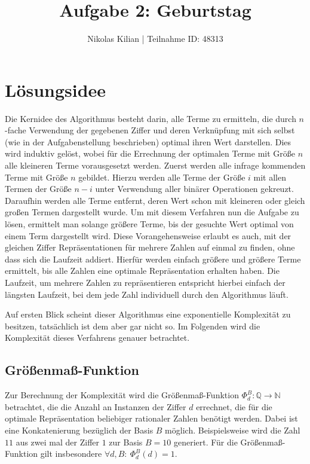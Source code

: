 \documentclass{article}
\newcommand{\Ftitle}{Aufgabe 2: Geburtstag}
\newcommand{\Fauthor}{Nikolas Kilian | Teilnahme ID: 48313}
\theoremstyle{nonumberplain}
\begin{document}
\title{\Ftitle}
\author{\Fauthor}

\maketitle

\tableofcontents

\section{Lösungsidee}

Die Kernidee des Algorithmus besteht darin, alle Terme zu ermitteln, die durch \(n\)-fache Verwendung der gegebenen Ziffer und deren Verknüpfung mit sich selbst (wie in der Aufgabenstellung beschrieben) optimal ihren Wert darstellen.
Dies wird induktiv gelöst, wobei für die Errechnung der optimalen Terme mit Größe \(n\) alle kleineren Terme vorausgesetzt werden.
Zuerst werden alle infrage kommenden Terme mit Größe \(n\) gebildet. Hierzu werden alle Terme der Größe \(i\) mit allen Termen der Größe \(n-i\) unter Verwendung aller binärer Operationen gekreuzt.
Daraufhin werden alle Terme entfernt, deren Wert schon mit kleineren oder gleich großen Termen dargestellt wurde.
Um mit diesem Verfahren nun die Aufgabe zu lösen, ermittelt man solange größere Terme, bis der gesuchte Wert optimal von einem Term dargestellt wird.
Diese Vorangehensweise erlaubt es auch, mit der gleichen Ziffer Repräsentationen für mehrere Zahlen auf einmal zu finden, ohne dass sich die Laufzeit addiert.
Hierfür werden einfach größere und größere Terme ermittelt, bis alle Zahlen eine optimale Repräsentation erhalten haben.
Die Laufzeit, um mehrere Zahlen zu repräsentieren entspricht hierbei einfach der längsten Laufzeit, bei dem jede Zahl individuell durch den Algorithmus läuft.

Auf ersten Blick scheint dieser Algorithmus eine exponentielle Komplexität zu besitzen, tatsächlich ist dem aber gar nicht so.
Im Folgenden wird die Komplexität dieses Verfahrens genauer betrachtet.

\newcommand{\fad}{\forall d, B:\ }
\newcommand{\measure}[1]{\Phi_{d}^{B}(#1)}

\subsection{Größenmaß-Funktion}

Zur Berechnung der Komplexität wird die Größenmaß-Funktion \(\Phi_{d}^{B} : \mathbb{Q} \to \mathbb{N}\) betrachtet, die die Anzahl an Instanzen der Ziffer \(d\) errechnet, die für die optimale Repräsentation beliebiger rationaler Zahlen benötigt werden. Dabei ist eine Konkatenierung bezüglich der Basis \(B\) möglich. Beispielsweise wird die Zahl \(11\) aus zwei mal der Ziffer \(1\)  zur Basis \(B=10\) generiert. Für die Größenmaß-Funktion gilt insbesondere \(\fad\measure{d} = 1\).
\end{document}
